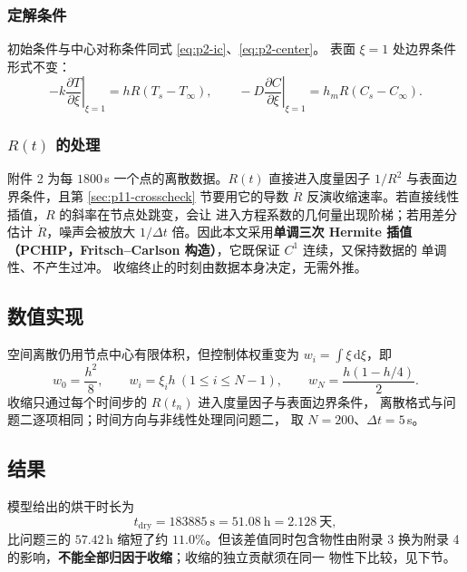 \documentclass[12pt,a4paper,fontset=none]{ctexart}
\begin{document}
\subsubsection{定解条件}

初始条件与中心对称条件同式 \eqref{eq:p2-ic}、\eqref{eq:p2-center}。
表面 $\xi=1$ 处边界条件形式不变：
\begin{equation}
  -k\left.\frac{\partial T}{\partial\xi}\right|_{\xi=1}
  =hR\left(T_s-T_\infty\right),\qquad
  -D\left.\frac{\partial C}{\partial\xi}\right|_{\xi=1}
  =h_mR\left(C_s-C_\infty\right).
  \label{eq:p4-bc}
\end{equation}

\subsubsection{$R(t)$ 的处理}

附件 2 为每 $1800$\,s 一个点的离散数据。$R(t)$ 直接进入度量因子
$1/R^2$ 与表面边界条件，且第 \ref{sec:p11-crosscheck} 节要用它的导数
$\dot R$ 反演收缩速率。若直接线性插值，$R$ 的斜率在节点处跳变，会让
进入方程系数的几何量出现阶梯；若用差分估计 $\dot R$，噪声会被放大
$1/\Delta t$ 倍。因此本文采用\textbf{单调三次 Hermite 插值
（PCHIP，Fritsch--Carlson 构造）}\cite{ref-fc}，它既保证 $C^1$ 连续，又保持数据的
单调性、不产生过冲。
收缩终止的时刻由数据本身决定，无需外推。

\subsection{数值实现}

空间离散仍用节点中心有限体积，但控制体权重变为
$w_i=\int\xi\,\mathrm{d}\xi$，即
\begin{equation}
  w_0=\frac{h^2}{8},\qquad w_i=\xi_i h\ (1\le i\le N-1),\qquad
  w_N=\frac{h(1-h/4)}{2}.
\end{equation}
收缩只通过每个时间步的 $R(t_n)$ 进入度量因子与表面边界条件，
离散格式与问题二逐项相同；时间方向与非线性处理同问题二，
取 $N=200$、$\Delta t=5$\,s。

\subsection{结果}

模型给出的烘干时长为
\begin{equation}
  t_{\mathrm{dry}}=183885\ \mathrm{s}=51.08\ \mathrm{h}=2.128\ \text{天},
\end{equation}
比问题三的 $57.42$\,h 缩短了约 $11.0\%$。但该差值同时包含物性由附录 3
换为附录 4 的影响，\textbf{不能全部归因于收缩}；收缩的独立贡献须在同一
物性下比较，见下节。
\end{document}

